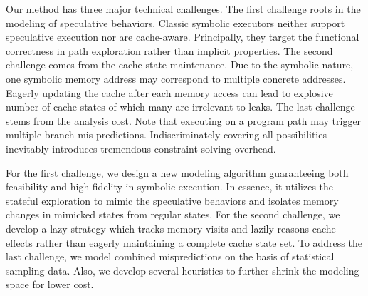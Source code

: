 \documentclass[sigconf, review]{acmart}
\newcommand\ignore[1]{}
\begin{document}
Our method has three major technical challenges. The first challenge roots
in the modeling of speculative behaviors. Classic symbolic executors
\cite{CadarDE08,PasareanuR10} neither support speculative execution nor are 
cache-aware. Principally, they target the functional correctness in path 
exploration rather than implicit properties. 
%
The second challenge comes from the cache state maintenance. Due to the 
symbolic nature, one symbolic memory address may correspond to multiple 
concrete addresses. Eagerly updating the cache after each memory access 
can lead to explosive number of cache states of which many are irrelevant 
to leaks. 
%
The last challenge stems from the analysis cost. Note that executing on a 
program path may trigger multiple branch mis-predictions. Indiscriminately
covering all possibilities inevitably introduces tremendous constraint 
solving overhead. 


\ignore{
  Not only results in tremendous constraint solving overhead but 
  also redundantly counts many unnecessary cases.
  We assume always mis-predict to soundly analyze the affected cache behavior, 
  whereas this assumption introduces tremendous cost.
}


For the first challenge, we design a new modeling algorithm guaranteeing 
both feasibility and high-fidelity in symbolic execution. In essence, it 
utilizes the stateful exploration to mimic the speculative behaviors and 
isolates memory changes in mimicked states from regular states. 
%
For the second challenge, we develop a lazy strategy which tracks memory 
visits and lazily reasons cache effects rather than eagerly maintaining 
a complete cache state set. 
%
To address the last challenge, we model combined mispredictions on the 
basis of statistical sampling data. Also, we develop several heuristics
to further shrink the modeling space for lower cost.



\ignore{
Also, We develop a merging schema between the mimicked states and regular 
symbolic states to accumulate the cache side effects.

In general, we decompose the precise but lengthy constraint 
into smaller chunks without losing correctness, as well as utilizing 
executor kernel characteristics for faster computation.

However, the side effects caused by speculative execution are normally 
undetectable under standard symbolic execution. To overcome this problem,
we introduce the $\mathit{speculative~modeling}$ into symbolic execution. 
Thus, cache side effects are visible and cache timing leaks from speculative 
execution detectable now. 
}
\end{document}
